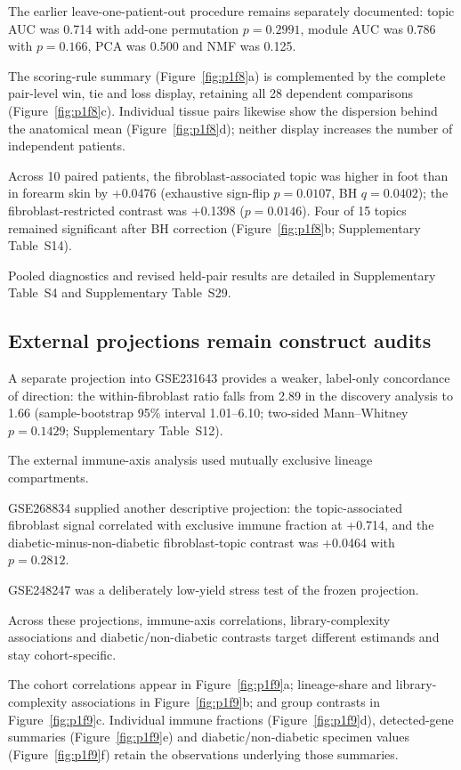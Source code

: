 \documentclass[10pt,a4paper]{article}
\begin{document}
The earlier leave-one-patient-out procedure remains separately documented: topic AUC was 0.714 with add-one permutation $p=0.2991$, module AUC was 0.786 with $p=0.166$, PCA was 0.500 and NMF was 0.125.



The scoring-rule summary (Figure~\ref{fig:p1f8}a\label{call:p1f8}) is complemented by the complete pair-level win, tie and loss display, retaining all 28 dependent comparisons (Figure~\ref{fig:p1f8}c). Individual tissue pairs likewise show the dispersion behind the anatomical mean (Figure~\ref{fig:p1f8}d); neither display increases the number of independent patients.

Across 10 paired patients, the fibroblast-associated topic was higher in foot than in forearm skin by +0.0476 (exhaustive sign-flip $p=0.0107$, BH $q=0.0402$); the fibroblast-restricted contrast was +0.1398 ($p=0.0146$). Four of 15 topics remained significant after BH correction (Figure~\ref{fig:p1f8}b; Supplementary Table~S14).

Pooled diagnostics and revised held-pair results are detailed in Supplementary Table~S4 and Supplementary Table~S29.

\subsection{External projections remain construct audits}

A separate projection into GSE231643 provides a weaker, label-only concordance of direction: the within-fibroblast ratio falls from 2.89 in the discovery analysis to 1.66 (sample-bootstrap 95\% interval 1.01--6.10; two-sided Mann--Whitney $p=0.1429$; Supplementary Table~S12).

The external immune-axis analysis used mutually exclusive lineage compartments.

GSE268834 supplied another descriptive projection: the topic-associated fibroblast signal correlated with exclusive immune fraction at +0.714, and the diabetic-minus-non-diabetic fibroblast-topic contrast was +0.0464 with $p=0.2812$.

GSE248247 was a deliberately low-yield stress test of the frozen projection.

Across these projections, immune-axis correlations, library-complexity associations and diabetic/non-diabetic contrasts target different estimands and stay cohort-specific.

The cohort correlations appear in Figure~\ref{fig:p1f9}a\label{call:p1f9}; lineage-share and library-complexity associations in Figure~\ref{fig:p1f9}b; and group contrasts in Figure~\ref{fig:p1f9}c. Individual immune fractions (Figure~\ref{fig:p1f9}d), detected-gene summaries (Figure~\ref{fig:p1f9}e) and diabetic/non-diabetic specimen values (Figure~\ref{fig:p1f9}f) retain the observations underlying those summaries.
\end{document}
